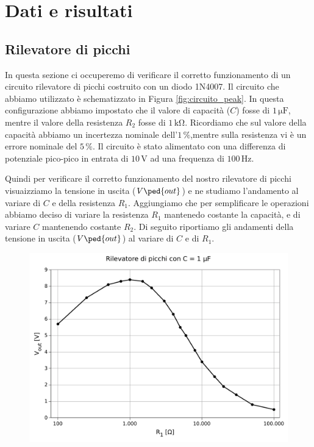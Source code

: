 \section*{Dati e risultati}

\subsection{Rilevatore di picchi}

In questa sezione ci occuperemo di verificare il corretto funzionamento di un circuito rilevatore di picchi costruito con un diodo 1N4007.
Il circuito che abbiamo utilizzato è schematizzato in Figura \ref{fig:circuito_peak}.
In questa configurazione abbiamo impostato che il valore di capacità ($C$) fosse di $1\,\si{\micro\farad}$, mentre il valore della resistenza $R_2$ fosse di $1\,\si{\kilo\ohm}$. Ricordiamo che sul valore della capacità abbiamo un incertezza nominale dell'$1\,\%$,mentre sulla resistenza vi è un errore nominale del $5\,\%$.
Il circuito è stato alimentato con una differenza di potenziale pico-pico in entrata di $10\,\si{\volt}$ ad una frequenza di $100\,\si{\hertz}$.

Quindi per verificare il corretto funzionamento del nostro rilevatore di picchi visuaizziamo la tensione in uscita ($V\ped{out}$) e ne studiamo l'andamento al variare di $C$ e della resistenza $R_1$.
Aggiungiamo che per semplificare le operazioni abbiamo deciso di variare la resistenza $R_1$ mantenedo costante la capacità, e di variare $C$ mantenendo costante $R_2$.
Di seguito riportiamo gli andamenti della tensione in uscita ($V\ped{out}$) al variare di $C$ e di $R_1$.

\begin{figure}[H]
    \includegraphics[scale=0.7]{capacita.pdf}
    \caption{}
    \label{fig:capacita}
\end{figure}

